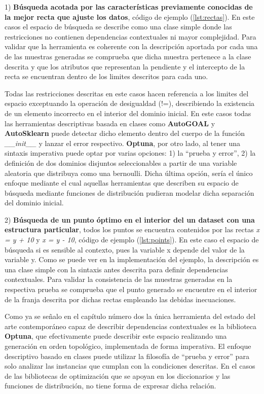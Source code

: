 1) {\bf Búsqueda acotada por las características previamente conocidas de la mejor recta que ajuste los
            datos}, código de ejemplo (\ref{lst:rectas}). En este casos el espacio de búsqueda se describe como una clase simple donde las restricciones
no contienen dependencias contextuales ni mayor complejidad. Para validar que la herramienta es
coherente con la descripción aportada por cada una de las muestras generadas se comprueba que dicha
muestra pertenece a la clase descrita y que los atributos que representan la pendiente y el intercepto
de la recta se encuentran dentro de los limites descritos para cada uno.

Todas las restricciones descritas en este casos hacen referencia a los limites del espacio exceptuando
la operación de desigualdad (!=), describiendo la existencia de un elemento incorrecto en el interior del
dominio inicial. En este casos todas las herramientas descriptivas basada en clases como {\bf AutoGOAL} y
      {\bf AutoSklearn} puede detectar dicho elemento dentro del cuerpo de la función {\it \_\_init\_\_} y lanzar el error
respectivo. {\bf Optuna}, por otro lado, al tener una sintaxis imperativa puede optar por varias opciones:
1) la ``prueba y error'', 2) la definición de dos dominios disjuntos seleccionables a partir de
una variable aleatoria que distribuya como una bernoulli. Dicha última opción, sería el único enfoque
mediante el cual aquellas herramientas que describen su espacio de búsqueda mediante funciones de
distribución pudieran modelar dicha separación del dominio inicial.


2) {\bf Búsqueda de un punto óptimo en el interior del un dataset con una estructura particular}, todos los
puntos se encuentra contenidos por las rectas {\it x = y + 10} y {\it x = y - 10}, código de ejemplo (\ref{lst:points}). En este caso el espacio de búsqueda
si es sensible al contexto, pues la variable x depende del valor de la variable y. Como se puede ver en la
implementación del ejemplo, la descripción es una clase simple con la sintaxis antes descrita para definir
dependencias contextuales. Para validar la consistencia de las muestras generadas en la respectiva prueba se
comprueba que el punto generado se encuentre en el interior de la franja descrita por dichas rectas empleando
las debidas inecuaciones.

Como ya se señalo en el capítulo número dos la única herramienta del estado del arte contemporáneo capaz de
describir dependencias contextuales es la biblioteca {\bf Optuna}, que efectivamente puede describir este espacio
realizando una generación en orden topológico, implementada de forma imperativa. El enfoque descriptivo basado en clases
puede utilizar la filosofía de ``prueba y error'' para solo analizar las instancias que cumplan con la condiciones
descritas. En el casos de las bibliotecas de optimización que se apoyan en los diccionarios y las funciones de
distribución, no tiene forma de expresar dicha relación.


